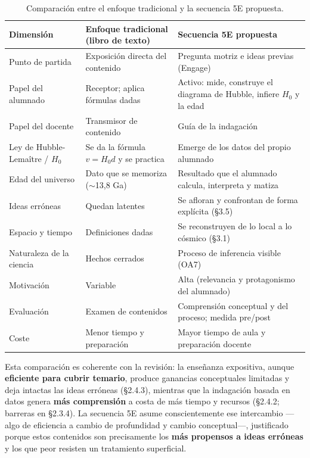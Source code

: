 \begin{table}[ht]
\centering
\caption{Comparación entre el enfoque tradicional y la secuencia 5E propuesta.}\label{tab:comparacion}
\begin{tabularx}{\textwidth}{|>{\raggedright\arraybackslash}p{2.7cm}|>{\raggedright\arraybackslash}X|>{\raggedright\arraybackslash}X|}
\hline
\rowcolor{naranja}
{\color{white}\textbf{Dimensión}} & {\color{white}\textbf{Enfoque tradicional (libro de texto)}} & {\color{white}\textbf{Secuencia 5E propuesta}} \\ \hline
Punto de partida & Exposición directa del contenido & Pregunta motriz e ideas previas (Engage) \\ \hline
Papel del alumnado & Receptor; aplica fórmulas dadas & Activo: mide, construye el diagrama de Hubble, infiere $H_{0}$ y la edad \\ \hline
Papel del docente & Transmisor de contenido & Guía de la indagación \\ \hline
Ley de Hubble-Lemaître / $H_{0}$ & Se da la fórmula $v = H_{0}d$ y se practica & Emerge de los datos del propio alumnado \\ \hline
Edad del universo & Dato que se memoriza ($\sim$13,8 Ga) & Resultado que el alumnado calcula, interpreta y matiza \\ \hline
Ideas erróneas & Quedan latentes & Se afloran y confrontan de forma explícita (§3.5) \\ \hline
Espacio y tiempo & Definiciones dadas & Se reconstruyen de lo local a lo cósmico (§3.1) \\ \hline
Naturaleza de la ciencia & Hechos cerrados & Proceso de inferencia visible (OA7) \\ \hline
Motivación & Variable & Alta (relevancia y protagonismo del alumnado) \\ \hline
Evaluación & Examen de contenidos & Comprensión conceptual y del proceso; medida pre/post \\ \hline
Coste & Menor tiempo y preparación & Mayor tiempo de aula y preparación docente \\ \hline
\end{tabularx}
\end{table}

Esta comparación es coherente con la revisión: la enseñanza expositiva, aunque \textbf{eficiente para cubrir temario}, produce ganancias conceptuales limitadas y deja intactas las ideas erróneas (§2.4.3), mientras que la indagación basada en datos genera \textbf{más comprensión} a costa de más tiempo y recursos (§2.4.2; barreras en §2.3.4). La secuencia 5E asume conscientemente ese intercambio ---algo de eficiencia a cambio de profundidad y cambio conceptual---, justificado porque estos contenidos son precisamente los \textbf{más propensos a ideas erróneas} y los que peor resisten un tratamiento superficial.

